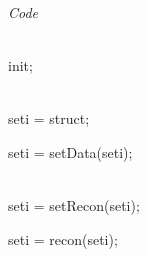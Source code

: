 \hfill\begingroup\color{gray}\vrule width 1pt\endgroup\hfill
\begin{minipage}[t]{\dimexpr.20\textwidth-\tabcolsep-.5pt}

\centerline{\emph{Code}}
\vspace*{-0.2cm}

\hrulefill

\ \\
\textsf{init;}
\ \\
\vspace*{-0.2cm}

\hrulefill

\ \\
\textsf{seti = struct;}

\textsf{seti = setData(seti);}

\vspace{5.75cm}

\hrulefill

\ \\
\textsf{seti = setRecon(seti);}

\textsf{seti = recon(seti);}

\end{minipage}

\hrulefill


